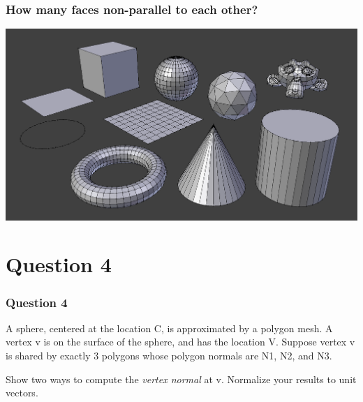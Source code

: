 \documentclass{beamer}
\begin{document}
\begin{frame}
    \frametitle{How many faces non-parallel to each other?}

    \begin{center}
        \includegraphics[scale=0.2]{modeling_meshes_primitives_all.png}
    \end{center}

\end{frame}

\section{Question 4}

\begin{frame}
    \frametitle{Question 4}

    A sphere, centered at the location C, is approximated by a polygon mesh.  
    A vertex v is on the surface of the sphere, and has the location V.  
    Suppose vertex v is shared by exactly 3 polygons whose polygon normals are N1, N2, and N3.
    
    \vspace*{1em}

    Show two ways to compute the \textit{vertex normal} at v. Normalize your results to unit vectors.

\end{frame}
\end{document}
